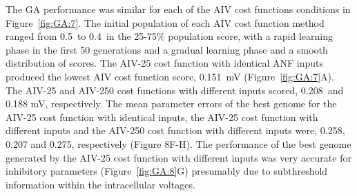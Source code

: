 The GA performance was similar for each of the AIV cost functions
conditions in Figure~\ref{fig:GA:7}. The initial population of each AIV
cost function method ranged from 0.5~to 0.4~in the 25-75\% population
score, with a rapid learning phase in the first 50 generations and a
gradual learning phase and a smooth distribution of scores.  The
AIV-25 cost function with identical ANF inputs produced the lowest AIV
cost function score, 0.151~mV (Figure~\ref{fig:GA:7}A).  The AIV-25 and
AIV-250 cost functions with different inputs scored, 0.208~and 0.188
mV, respectively.  The mean parameter errors of the best genome for
the AIV-25 cost function with identical inputs, the AIV-25 cost
function with different inputs and the AIV-250 cost function with
different inputs were, 0.258, 0.207 and 0.275, respectively (Figure
8F-H).  The performance of the best genome generated by the AIV-25
cost function with different inputs was very accurate for inhibitory
parameters (Figure~\ref{fig:GA:8}G) presumably due to subthreshold
information within the intracellular voltages. 


